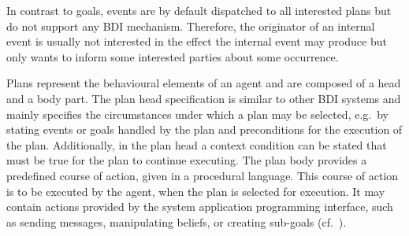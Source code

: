 In contrast to goals, events are by default dispatched to all interested plans but do not support any BDI mechanism.
Therefore, the originator of an internal event is usually not interested in the effect the internal event may produce but only wants to inform some interested parties about some occurrence.

Plans represent the behavioural elements of an agent and are composed of a head and a body part.
The plan head specification is similar to other BDI systems and mainly specifies the circumstances under which a plan may be selected, e.g.\ by stating events or goals handled by the plan and preconditions for the execution of the plan.
Additionally, in the plan head a context condition can be stated that must be true for the plan to continue executing.
The plan body provides a predefined course of action, given in a procedural language.
This course of action is to be executed by the agent, when the plan is selected for execution.
It may contain actions provided by the system application programming interface, such as sending messages, manipulating beliefs, or creating sub-goals (cf.~\cite{braubach_jadex_2004}).

